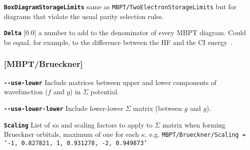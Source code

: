 \documentclass[a4paper,11pt]{article}
\newcommand{\option}[1]{\smallskip\noindent\textbf{\texttt{#1}}}
\newcommand{\code}[1]{\texttt{#1}}
\begin{document}
\option{BoxDiagramStorageLimits} same as \texttt{MBPT/TwoElectronStorageLimits} but for diagrams that violate the usual parity selection rules.

\option{Delta} [0.0] a number to add to the denominator of every MBPT diagram. Could be equal, for example, to the difference between the HF and the CI energy~\cite{kozlov99os,berengut08jpb}.

\subsubsection{[MBPT/Brueckner]}

\option{-{}-use-lower} Include matrices between upper and lower components of wavefunction ($f$ and $g$) in $\Sigma$ potential.

\option{-{}-use-lower-lower} Include lower-lower $\Sigma$ matrix (between $g$ and $g$).

\option{Scaling} List of $\kappa$s and scaling factors to apply to $\Sigma$ matrix when forming Brueckner orbitals, maximum of one for each $\kappa$.
e.g. \code{MBPT/Brueckner/Scaling = '-1, 0.827821, 1, 0.931278, -2, 0.949873'}
\end{document}

